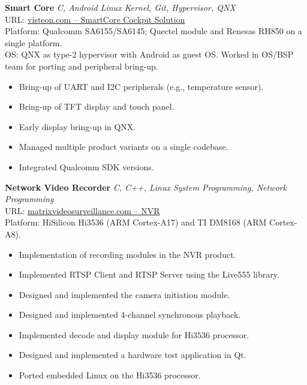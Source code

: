 \documentclass[a4paper]{article}
\begin{document}
{\textbf{Smart Core}} {\sl C, Android Linux Kernel, Git, Hypervisor, QNX} \\
URL: \href{https://www.visteon.com/newsroom/delivering-digital-integrated-cockpit-solution-smartcore/}{visteon.com -- SmartCore Cockpit Solution}\\
\vspace*{1mm}
Platform: Qualcomm SA6155/SA6145; Quectel module and Renesas RH850 on a single platform.\\
OS: QNX as type-2 hypervisor with Android as guest OS. Worked in OS/BSP team for porting and peripheral bring-up.\\
\begin{itemize} \itemsep 0.5pt
\item Bring-up of UART and I2C peripherals (e.g., temperature sensor).
\item Bring-up of TFT display and touch panel.
\item Early display bring-up in QNX.
\item Managed multiple product variants on a single codebase.
\item Integrated Qualcomm SDK versions.
\end{itemize}
\vspace*{2mm}

{\textbf{Network Video Recorder}} {\sl C, C++, Linux System Programming, Network Programming} \\
URL: \href{https://www.matrixvideosurveillance.com/network-video-recorder.html}{matrixvideosurveillance.com -- NVR}\\
\vspace*{1mm}
Platform: HiSilicon Hi3536 (ARM Cortex-A17) and TI DM8168 (ARM Cortex-A8).\\
\begin{itemize} \itemsep 0.5pt
\item Implementation of recording modules in the NVR product.
\item Implemented RTSP Client and RTSP Server using the Live555 library.
\item Designed and implemented the camera initiation module.
\item Designed and implemented 4-channel synchronous playback.
\item Implemented decode and display module for Hi3536 processor.
\item Designed and implemented a hardware test application in Qt.
\item Ported embedded Linux on the Hi3536 processor.
\end{itemize}
\vspace*{2mm}
\end{document}
